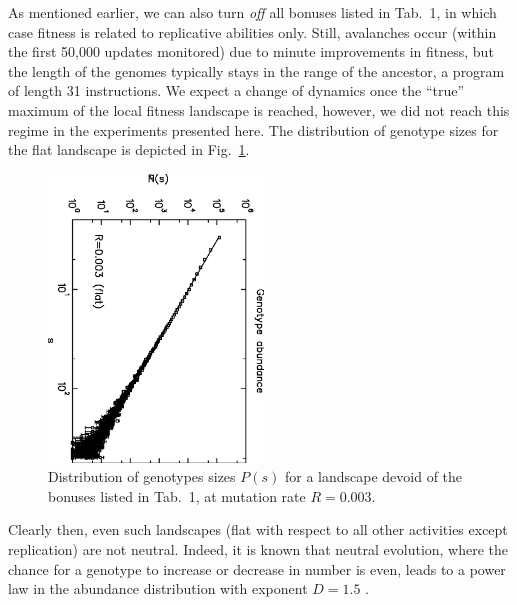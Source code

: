 \documentclass[letterpaper]{article}
\begin{document}
As mentioned earlier, we can also turn {\em off} all bonuses listed in
Tab.~1, in which case fitness is related to replicative abilities
only. Still, avalanches occur (within the first 50,000 updates
monitored) due to minute improvements in fitness, but the length of
the genomes typically stays in the range of the ancestor, a program of
length 31 instructions. We expect a change of dynamics once the
``true'' maximum of the local fitness landscape is reached, however,
we did not reach this regime in the experiments presented here. The
distribution of genotype sizes for the flat landscape is depicted in
Fig.~\ref{fig4}.


\begin{figure}[!tbp]
\begin{center}
\includegraphics[width=2.25in, angle=90]{fig4.eps}
\caption{Distribution of genotypes sizes $P(s)$ for a landscape devoid
  of the bonuses listed in Tab.~1, at mutation rate $R=0.003$.} \label{fig4}
\end{center}
\end{figure}


Clearly then, even such landscapes (flat with respect to all other
activities except replication) are not neutral. Indeed, it is known
that neutral evolution, where the chance for a genotype to increase or
decrease in number is even, leads to a power law in the abundance
distribution with exponent $D=1.5$ \citep{ABH}.
\end{document}
